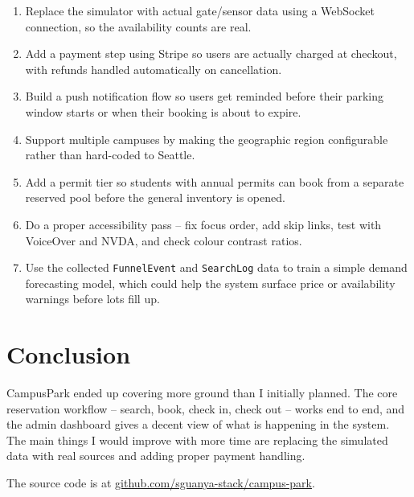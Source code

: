 \documentclass[11pt,letterpaper]{article}
\begin{document}
\begin{enumerate}[leftmargin=1.4em]
  \item Replace the simulator with actual gate/sensor data using a WebSocket
        connection, so the availability counts are real.

  \item Add a payment step using Stripe so users are actually charged at checkout,
        with refunds handled automatically on cancellation.

  \item Build a push notification flow so users get reminded before their
        parking window starts or when their booking is about to expire.

  \item Support multiple campuses by making the geographic region configurable
        rather than hard-coded to Seattle.

  \item Add a permit tier so students with annual permits can book from a
        separate reserved pool before the general inventory is opened.

  \item Do a proper accessibility pass -- fix focus order, add skip links,
        test with VoiceOver and NVDA, and check colour contrast ratios.

  \item Use the collected \texttt{FunnelEvent} and \texttt{SearchLog} data to
        train a simple demand forecasting model, which could help the system
        surface price or availability warnings before lots fill up.
\end{enumerate}

\section{Conclusion}

CampusPark ended up covering more ground than I initially planned.
The core reservation workflow -- search, book, check in, check out --
works end to end, and the admin dashboard gives a decent view of what
is happening in the system. The main things I would improve with more
time are replacing the simulated data with real sources and adding
proper payment handling.

The source code is at
\href{https://github.com/sguanya-stack/campus-park}{github.com/sguanya-stack/campus-park}.
\end{document}
